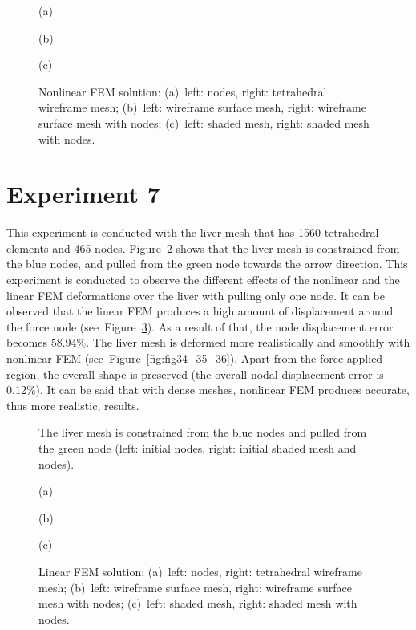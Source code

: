 \begin{figure}[h]
\centerline{}
\centerline{(a)}
\centerline{}
\centerline{(b)}
\centerline{}
\centerline{(c)}
\caption{Nonlinear FEM solution: (a)~left: nodes, right: tetrahedral wireframe mesh;
                                 (b)~left: wireframe surface mesh, right: wireframe surface mesh with nodes;
                                 (c)~left: shaded mesh, right: shaded mesh with nodes.}
\label{fig:fig27_28_29}
\end{figure}

\clearpage
\section{Experiment 7}
\label{vii}
This experiment is conducted with the liver mesh that has 1560-tetrahedral elements and 465 nodes. Figure~\ref{fig:fig30} shows that the liver mesh is constrained from the blue nodes, and pulled from the green node towards the arrow direction. This experiment is conducted to observe the different effects of the nonlinear and the linear FEM deformations over the liver with pulling only one node. It can be observed that the linear FEM produces a high amount of displacement around the force node (see~Figure~\ref{fig:fig31_32_33}). As a result of that, the node displacement error becomes 58.94\%. The liver mesh is deformed more realistically and smoothly with nonlinear FEM (see~Figure~\ref{fig:fig34_35_36}). Apart from the force-applied region, the overall shape is preserved (the overall nodal displacement error is 0.12\%). It can be said that with dense meshes, nonlinear FEM produces accurate, thus more realistic, results.

\begin{figure}[h]
\centerline{}
\caption{The liver mesh is constrained from the blue nodes and pulled from the green node (left: initial nodes, right: initial shaded mesh and nodes).}
\label{fig:fig30}
\end{figure}

\begin{figure}[h]
\centerline{}
\centerline{(a)}
\centerline{}
\centerline{(b)}
\centerline{}
\centerline{(c)}
\caption{Linear FEM solution: (a)~left: nodes, right: tetrahedral wireframe mesh;
                              (b)~left: wireframe surface mesh, right: wireframe surface mesh with nodes;
                              (c)~left: shaded mesh, right: shaded mesh with nodes.}
\label{fig:fig31_32_33}
\end{figure}

